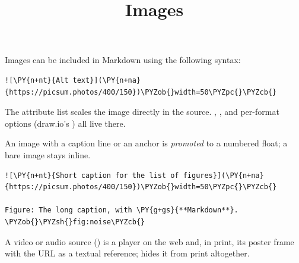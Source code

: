 \documentclass[a4paper,twoside]{article}
\title{Images}
\author{}\date{}
\begin{document}
\maketitle
Images can be included in Markdown using the following syntax:
\begin{tscode}[lang=md, engine=pygments]
\begin{Verbatim}[commandchars=\\\{\},breaklines, breakanywhere, commandchars=\\\{\}]
![\PY{n+nt}{Alt text}](\PY{n+na}{https://picsum.photos/400/150})\PYZob{}width=50\PYZpc{}\PYZcb{}
\end{Verbatim}
\end{tscode}
The attribute list scales the image directly in the source. , ,
 and per-format options (draw.io's ) all live there.

An image with a caption line or an anchor is \emph{promoted} to a numbered float; a
bare image stays inline.
\begin{tscode}[lang=md, engine=pygments]
\begin{Verbatim}[commandchars=\\\{\},breaklines, breakanywhere, commandchars=\\\{\}]
![\PY{n+nt}{Short caption for the list of figures}](\PY{n+na}{https://picsum.photos/400/150})\PYZob{}width=50\PYZpc{}\PYZcb{}

Figure: The long caption, with \PY{g+gs}{**Markdown**}. \PYZob{}\PYZsh{}fig:noise\PYZcb{}
\end{Verbatim}
\end{tscode}
A video or audio source () is a player on the web and, in
print, its poster frame with the URL as a textual reference;
 hides it from print altogether.
\end{document}
